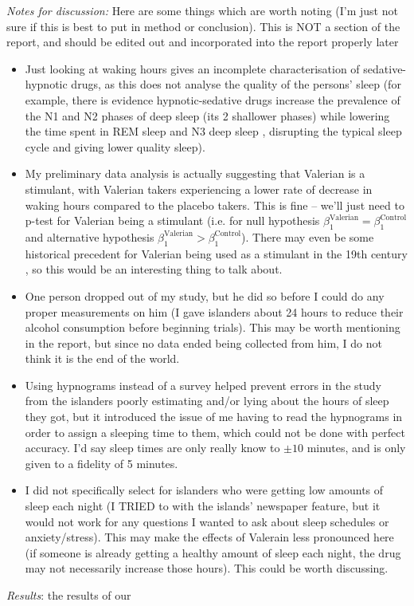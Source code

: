 \documentclass[10pt,preprintnumbers,amsmath,amssymb,floatfix,twocolumn,prl]{revtex4-2}
\begin{document}
\textit{Notes for discussion:} 
Here are some things which are worth noting (I'm just not sure if this is best to put in method or conclusion). This is NOT a section of the report, and should be edited out and incorporated into the report properly later
\begin{itemize}
\item Just looking at waking hours gives an incomplete characterisation of sedative-hypnotic drugs, as this does not analyse the quality of the persons' sleep (for example, there is evidence hypnotic-sedative drugs increase the prevalence of the N1 and N2 phases of deep sleep (its 2 shallower phases) while lowering the time spent in REM sleep and N3 deep sleep \cite{SleepCyclesSource}, disrupting the typical sleep cycle and giving lower quality sleep).

\item My preliminary data analysis is actually suggesting that Valerian is a stimulant, with Valerian takers experiencing a lower rate of decrease in waking hours compared to the placebo takers. This is fine -- we'll just need to p-test for Valerian being a stimulant (i.e. for null hypothesis $\beta_1^\text{Valerian} = \beta_1^\text{Control}$ and alternative hypothesis $\beta_1^\text{Valerian} > \beta_1^\text{Control}$). There may even be some historical precedent for Valerian being used as a stimulant in the 19th century \cite{ValerianSource2}, so this would be an interesting thing to talk about.

\item One person dropped out of my study, but he did so before I could do any proper measurements on him (I gave islanders about 24 hours to reduce their alcohol consumption before beginning trials). This may be worth mentioning in the report, but since no data ended being collected from him, I do not think it is the end of the world.

\item Using hypnograms instead of a survey helped prevent errors in the study from the islanders poorly estimating and/or lying about the hours of sleep they got, but it introduced the issue of me having to read the hypnograms in order to assign a sleeping time to them, which could not be done with perfect accuracy. I'd say sleep times are only really know to $\pm 10$ minutes, and is only given to a fidelity of 5 minutes.

\item I did not specifically select for islanders who were getting low amounts of sleep each night (I TRIED to with the islands' newspaper feature, but it would not work for any questions I wanted to ask about sleep schedules or anxiety/stress). This may make the effects of Valerain less pronounced here (if someone is already getting a healthy amount of sleep each night, the drug may not necessarily increase those hours). This could be worth discussing.
\end{itemize}

\textit{Results}: the results of our



\end{document}
